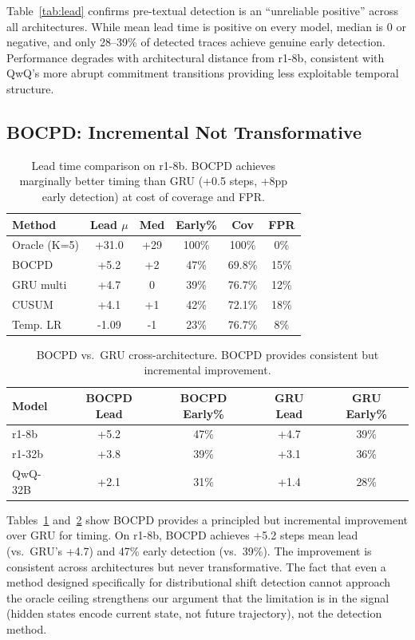 \documentclass[11pt,a4paper]{article}
\begin{document}
Table~\ref{tab:lead} confirms pre-textual detection is an ``unreliable positive'' across all architectures. While mean lead time is positive on every model, median is 0 or negative, and only 28--39\% of detected traces achieve genuine early detection. Performance degrades with architectural distance from r1-8b, consistent with QwQ's more abrupt commitment transitions providing less exploitable temporal structure.

\subsection{BOCPD: Incremental Not Transformative}
\label{sec:bocpd}

\begin{table}[t]
\centering
\small
\begin{tabular}{lccccc}
\toprule
Method & Lead $\mu$ & Med & Early\% & Cov & FPR \\
\midrule
Oracle (K=5) & +31.0 & +29 & 100\% & 100\% & 0\% \\
BOCPD & +5.2 & +2 & 47\% & 69.8\% & 15\% \\
GRU multi & +4.7 & 0 & 39\% & 76.7\% & 12\% \\
CUSUM & +4.1 & +1 & 42\% & 72.1\% & 18\% \\
Temp. LR & -1.09 & -1 & 23\% & 76.7\% & 8\% \\
\bottomrule
\end{tabular}
\caption{Lead time comparison on r1-8b. BOCPD achieves marginally better timing than GRU (+0.5 steps, +8pp early detection) at cost of coverage and FPR.}
\label{tab:bocpd}
\end{table}

\begin{table}[t]
\centering
\small
\begin{tabular}{lcccc}
\toprule
Model & BOCPD Lead & BOCPD Early\% & GRU Lead & GRU Early\% \\
\midrule
r1-8b & +5.2 & 47\% & +4.7 & 39\% \\
r1-32b & +3.8 & 39\% & +3.1 & 36\% \\
QwQ-32B & +2.1 & 31\% & +1.4 & 28\% \\
\bottomrule
\end{tabular}
\caption{BOCPD vs.\ GRU cross-architecture. BOCPD provides consistent but incremental improvement.}
\label{tab:bocpd_cross}
\end{table}

Tables~\ref{tab:bocpd} and~\ref{tab:bocpd_cross} show BOCPD provides a principled but incremental improvement over GRU for timing. On r1-8b, BOCPD achieves +5.2 steps mean lead (vs.\ GRU's +4.7) and 47\% early detection (vs.\ 39\%). The improvement is consistent across architectures but never transformative. The fact that even a method designed specifically for distributional shift detection cannot approach the oracle ceiling strengthens our argument that the limitation is in the signal (hidden states encode current state, not future trajectory), not the detection method.
\end{document}
